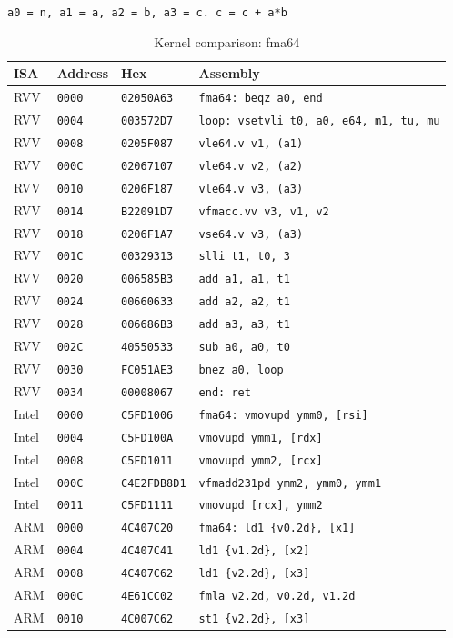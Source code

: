 \begin{table}[htbp]
\centering
\caption{Kernel comparison: fma64}
\begingroup
\scriptsize
\setlength{\tabcolsep}{4pt}
\noindent \texttt{a0 = n, a1 = a, a2 = b, a3 = c. c = c + a*b}\par
\vspace{0.6ex}
\begin{tabular}{@{}l|l|l|p{7.2cm}@{}}
\toprule
ISA & Address & Hex & Assembly \\
\midrule
RVV & \texttt{0000} & \texttt{02050A63} & \texttt{fma64: beqz a0, end} \\
RVV & \texttt{0004} & \texttt{003572D7} & \texttt{loop: vsetvli t0, a0, e64, m1, tu, mu} \\
RVV & \texttt{0008} & \texttt{0205F087} & \texttt{vle64.v v1, (a1)} \\
RVV & \texttt{000C} & \texttt{02067107} & \texttt{vle64.v v2, (a2)} \\
RVV & \texttt{0010} & \texttt{0206F187} & \texttt{vle64.v v3, (a3)} \\
RVV & \texttt{0014} & \texttt{B22091D7} & \texttt{vfmacc.vv v3, v1, v2} \\
RVV & \texttt{0018} & \texttt{0206F1A7} & \texttt{vse64.v v3, (a3)} \\
RVV & \texttt{001C} & \texttt{00329313} & \texttt{slli t1, t0, 3} \\
RVV & \texttt{0020} & \texttt{006585B3} & \texttt{add a1, a1, t1} \\
RVV & \texttt{0024} & \texttt{00660633} & \texttt{add a2, a2, t1} \\
RVV & \texttt{0028} & \texttt{006686B3} & \texttt{add a3, a3, t1} \\
RVV & \texttt{002C} & \texttt{40550533} & \texttt{sub a0, a0, t0} \\
RVV & \texttt{0030} & \texttt{FC051AE3} & \texttt{bnez a0, loop} \\
RVV & \texttt{0034} & \texttt{00008067} & \texttt{end: ret} \\
\midrule
Intel & \texttt{0000} & \texttt{C5FD1006} & \texttt{fma64: vmovupd ymm0, [rsi]} \\
Intel & \texttt{0004} & \texttt{C5FD100A} & \texttt{vmovupd ymm1, [rdx]} \\
Intel & \texttt{0008} & \texttt{C5FD1011} & \texttt{vmovupd ymm2, [rcx]} \\
Intel & \texttt{000C} & \texttt{C4E2FDB8D1} & \texttt{vfmadd231pd ymm2, ymm0, ymm1} \\
Intel & \texttt{0011} & \texttt{C5FD1111} & \texttt{vmovupd [rcx], ymm2} \\
\midrule
ARM & \texttt{0000} & \texttt{4C407C20} & \texttt{fma64: ld1 \{v0.2d\}, [x1]} \\
ARM & \texttt{0004} & \texttt{4C407C41} & \texttt{ld1 \{v1.2d\}, [x2]} \\
ARM & \texttt{0008} & \texttt{4C407C62} & \texttt{ld1 \{v2.2d\}, [x3]} \\
ARM & \texttt{000C} & \texttt{4E61CC02} & \texttt{fmla v2.2d, v0.2d, v1.2d} \\
ARM & \texttt{0010} & \texttt{4C007C62} & \texttt{st1 \{v2.2d\}, [x3]} \\
\bottomrule
\end{tabular}
\endgroup
\end{table}
\noindent{}\par
